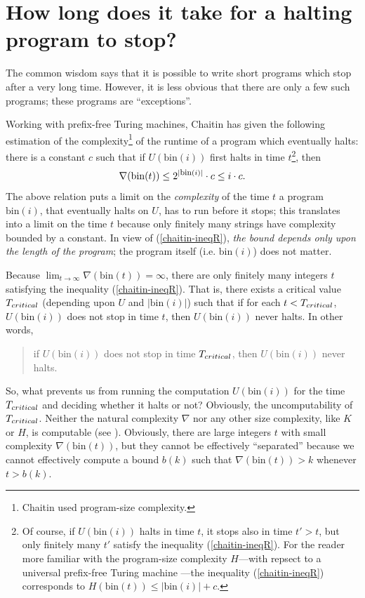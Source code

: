 \documentclass[12pt,twoside,openright]{report}
\newcommand{\bin}{\mbox{bin}}
\newcommand{\fbin}{\mbox{\rm \footnotesize{bin}}}
\begin{document}
\section{How long does it take for a halting program to stop?}

The common wisdom says that it is possible to write short programs which stop after a very long time. However, it is less obvious that there are only a few such programs; these programs are ``exceptions''. 

Working with prefix-free Turing machines, Chaitin \cite{busy} has given the following estimation of the complexity\footnote{Chaitin used  program-size complexity.} of the runtime of a program which eventually halts: there is a constant $c$ such that if $U(\bin(i))$ first halts in time $t$\footnote{Of course, if $U(\bin(i))$ halts in time $t$, it stops also in time $t'>t$, but only finitely many $t'$  satisfy the inequality (\ref{chaitin-ineqR}). For the reader more familiar with the program-size complexity $H$---with repsect to a universal prefix-free Turing machine \cite{Calude}---the inequality (\ref{chaitin-ineqR}) corresponds to $H(\bin(t)) \le |\bin(i)| +c$.}, then 
\begin{equation}
\label{chaitin-ineqR}\nabla (\bin (t)) \le 2^{|\fbin(i)|}\cdot c \le i\cdot c.
\end{equation} 
The above relation puts a limit on the {\it complexity} of the time $t$ a program $\bin(i)$, that eventually halts on $U$, has to run before it stops; this translates into a  limit on the  time  $t$ because only finitely many strings have complexity bounded by a constant.  In view of (\ref{chaitin-ineqR}), {\it the bound depends only upon the  length of the program}; the program itself (i.e. $\bin(i)$) does not matter.


Because $\lim_{t\rightarrow \infty}\nabla (\bin(t)) = \infty$, there are only finitely many integers $t$ satisfying the inequality (\ref{chaitin-ineqR}). That is, there exists a critical value $T_{\footnotesize critical}$ (depending upon $U$ and  $|\bin(i)|$) such that if for each $t < T_{\footnotesize critical}$, $U(\bin(i))$ does not stop in time $t$, then $U(\bin(i))$ never halts. In other words, 
\begin{quote}
if $U(\bin(i))$ does not stop in time $T_{\footnotesize critical}$, then $U(\bin(i))$ never halts. 
\end{quote}


So, what prevents us from running the computation $U(\bin(i))$ for the time $T_{\footnotesize critical}$ and deciding whether it halts or not?  Obviously, the uncomputability of $T_{\footnotesize critical}$.  Neither the natural complexity $\nabla$ nor any other size complexity, like $K$ or $H$, is computable (see \cite{Calude}).  Obviously, there are large integers $t$ with small complexity $\nabla(\bin(t))$, but they cannot be effectively ``separated'' because  we cannot effectively compute a bound $b(k)$ such that $\nabla (\bin(t))>k$ whenever $t > b(k)$.
\end{document}
